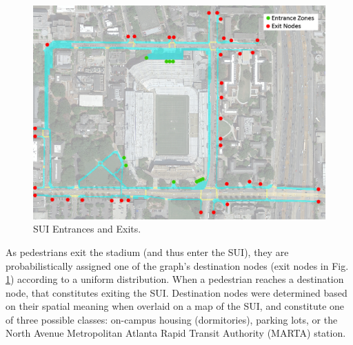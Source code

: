 \documentclass[12pt]{article}
\begin{document}
\begin{figure}[t]
  \includegraphics[width=\linewidth,natwidth=1026,natheight=750]{GATechMap_20160301_EntranceExits.png}
  \caption{SUI Entrances and Exits.}
  \label{fig:mapentranceexits}
\end{figure}

As pedestrians exit the stadium (and thus enter the SUI), they are
probabilistically assigned one of the graph's destination nodes (exit nodes
in Fig. \ref{fig:mapentranceexits}) according to a uniform distribution. When
a pedestrian reaches a destination node, that constitutes exiting the SUI.
Destination nodes were determined based on their spatial meaning when overlaid
on a map of the SUI, and constitute one of three possible classes: on-campus
housing (dormitories), parking lots, or the North Avenue Metropolitan Atlanta
Rapid Transit Authority (MARTA) station.
\end{document}

